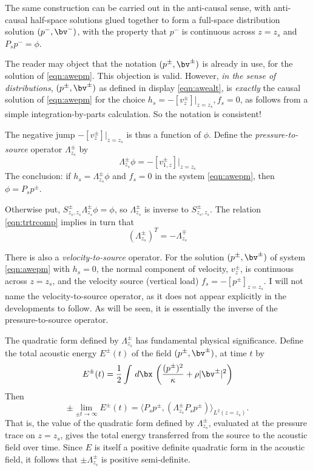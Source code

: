 The same construction can be carried out in the anti-causal sense,
with anti-causal half-space solutions glued together to form a
full-space distribution solution $(p^-,\bv^-)$, with the property that
$p^-$ is continuous across $z=z_s$ and $P_sp^-=\phi$.

The reader may object that the notation $(p^\pm,\bv^\pm)$ is already in
use, for the solution of \ref{eqn:awepm}. This objection is
valid. However, {\em in the sense
  of distributions}, $(p^{\pm},\bv^{\pm})$ as defined in display
\ref{eqn:awealt}, is {\em exactly} the causal solution of \ref{eqn:awepm}
for the choice $h_s = -[v^{\pm}_{z}]|_{z=z_s}, f_s=0$, as follows from a
simple integration-by-parts calculation. So the notation is consistent!

The negative jump $-[v^{\pm}_{z}]|_{z=z_s}$ is thus a function of $\phi$. Define
the {\em pressure-to-source} operator $\Lambda^{\pm}_{z_s}$ by
\begin{equation}
  \label{eqn:deflam}
  \Lambda^{\pm}_{z_s}\phi = -[v^{\pm}_{1,z}]|_{z=z_s}
\end{equation}
The conclusion: if $h_s = \Lambda^{\pm}_{z_s}\phi$ and $f_s=0$ in the
system \ref{eqn:awepm}, then $\phi=P_sp^{\pm}$.

Otherwise put, $S^{\pm}_{z_s,z_s}\Lambda^{\pm}_{z_s} \phi = \phi$, so
$\Lambda^{\pm}_{z_s}$ is inverse to $S^{\pm}_{z_s,z_s}$. The relation
\ref{eqn:trtrcomp} implies in turn that
\begin{equation}
  \label{eqn:lamadj}
  (\Lambda^{\pm}_{z_s})^T = - \Lambda^{\mp}_{z_s}
\end{equation}

There is also a {\em velocity-to-source} operator. For the solution
$(p^{\pm},\bv^{\pm})$ of system \ref{eqn:awepm} with $h_s=0$, the
normal component of velocity, $v^{\pm}_z$, is continuous across
$z=z_s$, and the velocity source (vertical load)
$f_s=-[p^{\pm}]_{z=z_s}$. I will not name the velocity-to-source
operator, as it does not appear explicitly in the developments to
follow. As will be seen, it is essentially the inverse of the
pressure-to-source operator.

The quadratic form defined by $\Lambda^{\pm}_{z_s}$ has fundamental
physical significance. Define the total acoustic energy $E^{\pm}(t)$ of the
field $(p^{\pm},\bv^{\pm})$, at time $t$ by
\begin{equation}
  \label{eqn:defae0}
  E^{\pm}(t) = \frac{1}{2} \int \,d\bx \, \left(\frac{(p^{\pm})^2}{\kappa} + \rho |\bv^{\pm}|^2\right)
\end{equation}
Then
\begin{equation}
  \label{eqn:elim}
  \pm \lim_{\pm t \rightarrow \infty} E^{\pm}(t) =  \langle P_sp^{\pm},
  (\Lambda^{\pm}_{z_s} P_sp^{\pm}) \rangle_{L^2(z=z_s)}.
\end{equation}
That is, the value of the quadratic form defined by
$\Lambda^{\pm}_{z_s}$, evaluated at the pressure trace on $z=z_s$,
gives the total energy transferred from the source to the
acoustic field over time. Since $E$ is itself a positive definite
quadratic form in the acoustic field, it follows that $\pm
\Lambda^{\pm}_{z_s}$ is positive semi-definite. 

